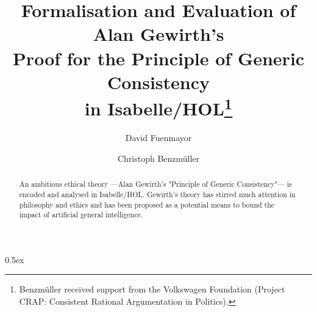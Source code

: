 \documentclass[11pt,a4paper]{article}
\begin{document}
\title{Formalisation and Evaluation of Alan Gewirth's \\
	Proof for the Principle of Generic Consistency\\
	in Isabelle/HOL\thanks{Benzm\"uller received support from the
          Volkswagen Foundation (Project CRAP: Consistent Rational
          Argumentation in Politics).}}
\author[1]{David Fuenmayor}
\author[1,2]{Christoph Benzm\"uller}

\maketitle

\begin{abstract}
An ambitious ethical theory ---Alan Gewirth's "Principle of Generic
Consistency"--- is encoded and analysed in Isabelle/HOL. 
Gewirth's theory has stirred much attention in philosophy and ethics and has been proposed as a
potential means to bound the impact of artificial general intelligence.
\end{abstract}


\parindent 0pt\parskip 0.5ex





\end{document}
